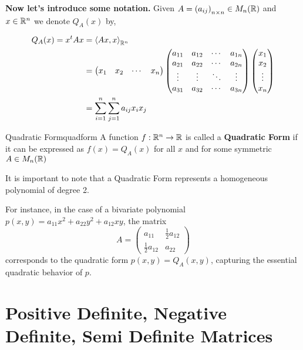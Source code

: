 \documentclass[../Analysis-3.tex]{subfiles}
\begin{document}
\textbf{Now let's introduce some notation.} Given $A = \left( a_{ij} \right)_{n\times n} \in M_n(\mathbb{R})$ and $ x \in \mathbb{R}^n $ we denote $ Q_A(x) $  by,

\begin{align*}
  Q_A(x) = x^tAx
   & = {\left\langle Ax,x \right\rangle}_{\mathbb{R}^n}
  \\
   & = \begin{pmatrix}
         x_1 & x_2 & \cdots & x_n
       \end{pmatrix} \begin{pmatrix}
                       a_{11} & a_{12} & \cdots & a_{1n} \\
                       a_{21} & a_{22} & \cdots & a_{2n} \\
                       \vdots & \vdots & \ddots & \vdots \\
                       a_{31} & a_{32} & \cdots & a_{3n}
                     \end{pmatrix} \begin{pmatrix}
                                     x_1 \\ x_2 \\ \vdots \\ x_n
                                   \end{pmatrix} \\
   & = \sum_{i=1}^{n}\sum_{j=1}^{n} a_{ij} x_i x_j
\end{align*}


\begin{Def}{Quadratic Form}{quadform}
  A function $f : \mathbb{R}^n \to \mathbb{R}$ is called a \textbf{Quadratic Form} if it can be expressed as $f(x) = Q_A(x)$ for all $x$ and for some symmetric $A \in M_n(\mathbb{R})$
\end{Def}

It is important to note that a Quadratic Form represents a homogeneous polynomial of degree 2.

For instance, in the case of a bivariate polynomial $p(x,y) = a_{11} x^2 + a_{22} y^2 + a_{12} xy$, the matrix \[ A = \begin{pmatrix}
    a_{11}             & \frac{1}{2} a_{12} \\
    \frac{1}{2} a_{12} & a_{22}
  \end{pmatrix} \] corresponds to the quadratic form $p(x,y) = Q_A(x,y)$, capturing the essential quadratic behavior of $p$.

\section{Positive Definite, Negative Definite, Semi Definite Matrices}
\end{document}
